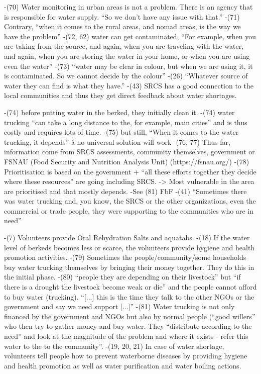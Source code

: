 -(70) Water monitoring in urban areas is not a problem. There is an agency that is responsible for water supply. “So we don't have any issue with that.”
-(71) Contrary, “when it comes to the rural areas, and nomad areas, is the way we have the problem”
-(72, 62) water can get contaminated, “For example, when you are taking from the source, and again, when you are traveling with the water, and again, when you are storing the water in your home, or when you are using even the water”
-(73) “water may be clear in colour, but when we are using it, it is contaminated. So we cannot decide by the colour”
-(26) “Whatever source of water they can find is what they have.”
-(43) SRCS has a good connection to the local communities and thus they get direct feedback about water shortages.

-(74) before putting water in the berked, they initially clean it.
-(74) water trucking “can take a long distance to the, for example, main cities” and is thus costly and requires lots of time.
-(75) but still, “When it comes to the water trucking, it depends” à no universal solution will work
-(76, 77) Thus far, information come from SRCS assessments, community themselves, government or FSNAU (Food Security and Nutrition Analysis Unit) (https://fsnau.org/)
-(78) Prioritisation is based on the government + “all these efforts together they decide where these resources” are going including SRCS. -> Most vulnerable in the area are prioritised and that mostly depends.
-See (81) FbF
-(41) “Sometimes there was water trucking and, you know, the SRCS or the other organizations, even the commercial or trade people, they were supporting to the communities who are in need”

-(7) Volunteers provide Oral Rehydration Salts and aquatabs.
-(18) If the water level of berkeds becomes less or scarce, the volunteers provide hygiene and health promotion activities.
-(79) Sometimes the people/community/some households buy water trucking themselves by bringing their money together. They do this in the initial phase.
-(80) “people they are depending on their livestock” but “if there is a drought the livestock become weak or die” and the people cannot afford to buy water (trucking). “[...] this is the time they talk to the other NGOs or the government and say we need support [...]”
-(81) Water trucking is not only financed by the government and NGOs but also by normal people (“good willers” who then try to gather money and buy water. They “distribute according to the need” and look at the magnitude of the problem and where it exists - refer this water to the to the community”.
-(19, 20, 21) In case of water shortage, volunteers tell people how to prevent waterborne diseases by providing hygiene and health promotion as well as water purification and water boiling actions.






